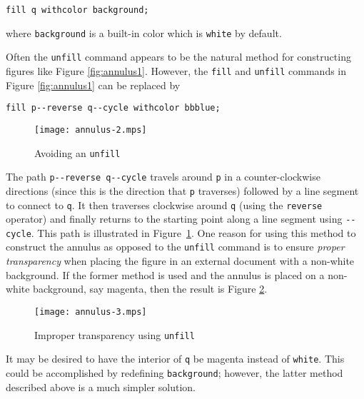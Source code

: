 \begin{center}
  \verb|fill q withcolor background;|
\end{center}
where \texttt{background} is a built-in color which is \texttt{white} by
default.

Often the \texttt{unfill} command appears to be the natural method for
constructing figures like Figure \ref{fig:annulus1}.  However, the
\texttt{fill} and \texttt{unfill} commands in Figure \ref{fig:annulus1}
can be replaced by

\begin{center}
  \verb|fill p--reverse q--cycle withcolor bbblue;|
\end{center}

\begin{figure}
  \centering
  \texttt{[image: annulus-2.mps]}
  \caption{Avoiding an \texttt{unfill}}
  \label{fig:annulus2}
\end{figure}

The path \verb|p--reverse q--cycle| travels around \texttt{p} in a
counter-clockwise directions (since this is the direction that
\texttt{p} traverses) followed by a line segment to connect to
\texttt{q}.  It then traverses clockwise around \texttt{q} (using the
\texttt{reverse} operator) and finally returns to the starting point
along a line segment using \texttt{-{}-cycle}.  This path is illustrated
in Figure~\ref{fig:annulus2}.  One reason for using this method to
construct the annulus as opposed to the \texttt{unfill} command is to
ensure \textit{proper transparency} when placing the figure in an
external document with a non-white background.  If the former method is
used and the annulus is placed on a non-white background, say magenta,
then the result is Figure \ref{fig:annulus3}.

\begin{figure}
  \centering
  \texttt{[image: annulus-3.mps]}
  \caption{Improper transparency using \texttt{unfill}}
  \label{fig:annulus3}
\end{figure}

It may be desired to have the interior of \texttt{q} be magenta instead
of \texttt{white}.  This could be accomplished by redefining
\texttt{background}; however, the latter method described above is a
much simpler solution.
